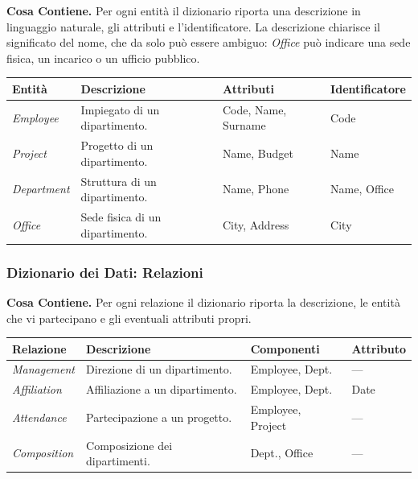 \documentclass[12pt]{extarticle}
\begin{document}
\noindent \textbf{Cosa Contiene.} Per ogni entità il dizionario riporta una descrizione in linguaggio naturale, gli attributi e l'identificatore. La descrizione chiarisce il significato del nome, che da solo può essere ambiguo: \textit{Office} può indicare una sede fisica, un incarico o un ufficio pubblico.

\begin{center}
\small
\begin{tabular}{@{}L{2.6cm}L{4.6cm}L{4.4cm}L{3.0cm}@{}}
    \toprule
    \textbf{Entità} & \textbf{Descrizione} & \textbf{Attributi} & \textbf{Identificatore} \\
    \midrule
    \textit{Employee} & Impiegato di un dipartimento. & Code, Name, Surname & Code \\
    \addlinespace
    \textit{Project} & Progetto di un dipartimento. & Name, Budget & Name \\
    \addlinespace
    \textit{Department} & Struttura di un dipartimento. & Name, Phone & Name, Office \\
    \addlinespace
    \textit{Office} & Sede fisica di un dipartimento. & City, Address & City \\
    \bottomrule
\end{tabular}
\end{center}


\subsubsection{Dizionario dei Dati: Relazioni}

\noindent \textbf{Cosa Contiene.} Per ogni relazione il dizionario riporta la descrizione, le entità che vi partecipano e gli eventuali attributi propri.

\begin{center}
\small
\begin{tabular}{@{}L{3.0cm}L{5.0cm}L{4.0cm}L{2.8cm}@{}}
    \toprule
    \textbf{Relazione} & \textbf{Descrizione} & \textbf{Componenti} & \textbf{Attributo} \\
    \midrule
    \textit{Management} & Direzione di un dipartimento. & Employee, Dept. & --- \\
    \addlinespace
    \textit{Affiliation} & Affiliazione a un dipartimento. & Employee, Dept. & Date \\
    \addlinespace
    \textit{Attendance} & Partecipazione a un progetto. & Employee, Project & --- \\
    \addlinespace
    \textit{Composition} & Composizione dei dipartimenti. & Dept., Office & --- \\
    \bottomrule
\end{tabular}
\end{center}
\end{document}
